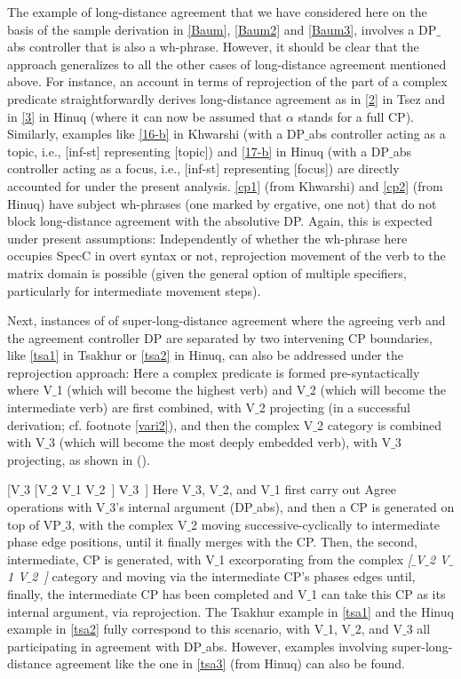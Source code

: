 \documentclass[output=paper
,modfonts
,nonflat]{langsci/langscibook}
\begin{document}
The example of long-distance agreement that we have considered here on
the basis of the sample derivation in \ref{Baum}, \ref{Baum2} and
\ref{Baum3}, involves a DP$\_${abs} controller that is also a
wh-phrase. However, it should be clear that the approach generalizes
to all the other cases of long-distance agreement mentioned
above. For instance, an account in terms of reprojection of the part
of a complex predicate straightforwardly derives long-distance
agreement as in \ref{2} in Tsez and in \ref{3} in Hinuq (where it can
now be assumed that $\alpha$ stands for a full CP). Similarly,
examples like \ref{16-b} in Khwarshi (with a DP$\_${abs} controller
acting as a topic, i.e., [inf-st] representing [topic]) and \ref{17-b}
in Hinuq (with a DP$\_${abs} controller acting as a focus, i.e., [inf-st]
representing [focus]) are directly accounted for under the present
analysis. \ref{cp1} (from Khwarshi) and \ref{cp2} (from Hinuq) have
subject wh-phrases (one marked by ergative, one not) that do not block
long-distance agreement with the absolutive DP. Again, this is
expected under present assumptions: Independently of whether the
wh-phrase here occupies SpecC in overt syntax or not, reprojection
movement of the verb to the matrix domain is possible (given the
general option of multiple specifiers, particularly for intermediate
movement steps). 

Next, instances of of super-long-distance agreement where the
agreeing verb and the agreement controller DP are separated by two
intervening CP boundaries, like \ref{tsa1} in Tsakhur or \ref{tsa2} in
Hinuq, can also be addressed under the reprojection approach: Here a complex
predicate is formed pre-syntactically where V$\_$1 (which will become the
highest verb) and V$\_$2 (which will become the intermediate verb) are
first combined, with V$\_$2 projecting (in a successful derivation;
cf. footnote \ref{vari2}), and then the complex V$\_$2 category is
combined with V$\_$3 (which will become the most deeply embedded verb),
with V$\_$3 projecting, as shown in (\Next).

\ea\relax\label{ex:mueller:35} [V$\_$3 [V$\_$2 V$\_$1 V$\_$2~] V$\_$3~]\z
Here V$\_$3, V$\_$2, and V$\_$1 first carry out Agree operations with V$\_$3's
internal argument (DP$\_${abs}), and then a CP is generated on top of
VP$\_$3, with the complex V$\_$2 moving successive-cyclically to
intermediate phase edge positions, until it finally merges with the
CP. Then, the second, intermediate, CP is generated, with V$\_$1
excorporating from the complex {\itshape [$\_${V$\_$2} V$\_$1 V$\_$2~]} category and
moving via the intermediate CP's phases edges until, finally, the
intermediate CP has been completed and V$\_$1 can take this CP as its
internal argument, via reprojection. The Tsakhur example in \ref{tsa1}
and the Hinuq example in \ref{tsa2} 
fully correspond to this scenario, with V$\_$1, V$\_$2, and V$\_$3 all
participating in agreement with DP$\_${abs}. However, examples
involving super-long-distance agreement like the one in 
\ref{tsa3} (from Hinuq) can also be found. 
\end{document}
